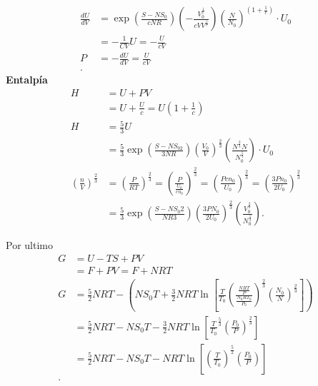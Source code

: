 \documentclass{report}
\begin{document}
\begin{align*}
  \frac{dU}{dV}&= \exp\left( \frac{S-NS_0}{cNR} \right) \left( -\frac{V_0^{\frac{1}{c}}}{cVV^{\frac{1}{c}}} \right) \left( \frac{N}{N_0} \right)^{\left( 1+\frac{1}{c} \right) }\cdot U_0 \\
    &= -\frac{1}{CV}U=-\frac{U}{cV} \\
    P&= -\frac{dU}{dV}=\frac{U}{cV} \\
.\end{align*}
\textbf{Entalpía}
\begin{align*}
  H&= U + PV \\
  &= U+\frac{U}{c}=U\left( 1+\frac{1}{c} \right)  \\
  H&= \frac{5}{3}U\\
   &= \frac{5}{3}\exp\left( \frac{S-NS_02}{3NR} \right)\left( \frac{V_0}{V} \right)^{\frac{2}{3}} \left( \frac{N^{\frac{2}{3}}N}{N_0^{\frac{5}{3}}} \right) \cdot U_0 \\
  \left( \frac{n}{V} \right) ^{\frac{2}{3}}&=\left( \frac{P}{RT} \right)^{\frac{2}{3}}=\left( \frac{P}{\frac{U_0}{cn_0}} \right)^{\frac{2}{3}}=\left( \frac{Pcn_0}{U_0} \right)^{\frac{2}{3}}=\left( \frac{3Pn_0}{2U_0} \right)^{\frac{2}{3}}\\
	    &= \frac{5}{3}\exp\left( \frac{S-NS_0 2}{NR 3} \right) \left( \frac{3PN_0}{2U_0} \right)^{\frac{2}{3}}\left( \frac{V_0^{\frac{2}{3}}}{N_0^{\frac{5}{3}}} \right)
.\end{align*}

Por ultimo 
\begin{align*}
  G &= U-TS+PV\\
  &= F+PV=F+NRT \\
  G &= \frac{5}{2}NRT-\left( NS_0T+\frac{3}{2}NRT\ln\left[ \frac{T}{T_0}\left( \frac{\frac{NRT}{P}}{\frac{N_0RT_0}{P_0}} \right)^{\frac{2}{3}}\left( \frac{N_0}{N} \right)^{\frac{2}{3}} \right]  \right)  \\
    &= \frac{5}{2}NRT-NS_0T-\frac{3}{2}NRT\ln\left[ \frac{T}{T_0}^{\frac{5}{3}}\left( \frac{P_0}{P} \right)^{\frac{2}{3}} \right]  \\
    &= \frac{5}{2}NRT-NS_0T-NRT\ln\left[ \left( \frac{T}{T_0} \right)^{\frac{5}{2}}\left( \frac{P_0}{P} \right)  \right]  \\
.\end{align*}
\end{document}
